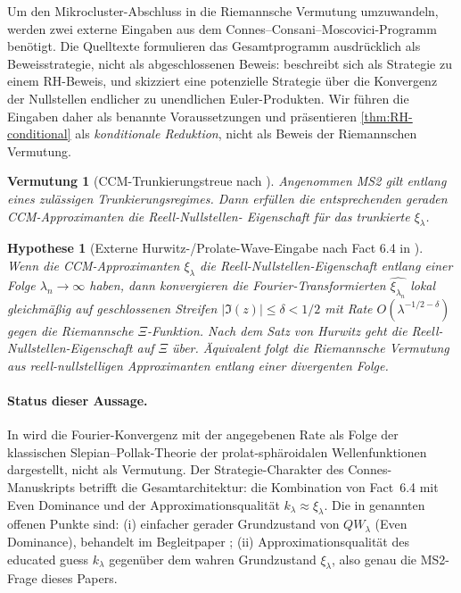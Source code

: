\documentclass[12pt,a4paper]{article}
\newtheorem{conjecture}[theorem]{Vermutung}
\newtheorem{hypothesis}[theorem]{Hypothese}
\theoremstyle{definition}
\theoremstyle{remark}
\begin{document}
Um den Mikrocluster-Abschluss in die Riemannsche Vermutung umzuwandeln,
werden zwei externe Eingaben aus dem Connes--Consani--Moscovici-Programm
benötigt. Die Quelltexte formulieren das Gesamtprogramm ausdrücklich als
Beweisstrategie, nicht als abgeschlossenen Beweis: \cite{CCM2025} beschreibt
sich als Strategie zu einem RH-Beweis, und \cite{Connes2026} skizziert eine
potenzielle Strategie über die Konvergenz der Nullstellen endlicher zu
unendlichen Euler-Produkten. Wir führen die Eingaben daher als benannte
Voraussetzungen und präsentieren \cref{thm:RH-conditional} als
\emph{konditionale Reduktion}, nicht als Beweis der Riemannschen Vermutung.

\begin{conjecture}[CCM-Trunkierungstreue nach \cite{CCM2025,Connes2026}]
\label{conj:ccm-blackbox}
Angenommen MS2 gilt entlang eines zulässigen Trunkierungsregimes. Dann
erfüllen die entsprechenden geraden CCM-Approximanten die Reell-Nullstellen-
Eigenschaft für das trunkierte $\xi_\lambda$.
\end{conjecture}

\begin{hypothesis}[Externe Hurwitz-/Prolate-Wave-Eingabe nach Fact 6.4 in \cite{Connes2026}]
\label{conj:hurwitz-blackbox}
Wenn die CCM-Approximanten $\xi_\lambda$ die Reell-Nullstellen-Eigenschaft
entlang einer Folge $\lambda_n\to\infty$ haben, dann konvergieren die
Fourier-Transformierten $\widehat{\xi_{\lambda_n}}$ lokal gleichmäßig auf
geschlossenen Streifen $|\Im(z)|\le\delta<1/2$ mit Rate
$O(\lambda^{-1/2-\delta})$ gegen die Riemannsche $\Xi$-Funktion. Nach dem
Satz von Hurwitz geht die Reell-Nullstellen-Eigenschaft auf $\Xi$ über.
Äquivalent folgt die Riemannsche Vermutung aus reell-nullstelligen
Approximanten entlang einer divergenten Folge.
\end{hypothesis}

\paragraph{Status dieser Aussage.}
In \cite[Fact~6.4 von §6.5]{Connes2026} wird die Fourier-Konvergenz mit
der angegebenen Rate als Folge der klassischen Slepian--Pollak-Theorie der
prolat-sphäroidalen Wellenfunktionen dargestellt, nicht als Vermutung. Der
Strategie-Charakter des Connes-Manuskripts betrifft die Gesamtarchitektur:
die Kombination von Fact~6.4 mit Even Dominance und der
Approximationsqualität $k_\lambda\approx\xi_\lambda$. Die in
\cite[§6.6]{Connes2026} genannten offenen Punkte sind: (i) einfacher
gerader Grundzustand von $QW_\lambda$ (Even Dominance), behandelt im
Begleitpaper \cite{Geiger2026evendom}; (ii) Approximationsqualität des
educated guess $k_\lambda$ gegenüber dem wahren Grundzustand
$\xi_\lambda$, also genau die MS2-Frage dieses Papers.
\end{document}
